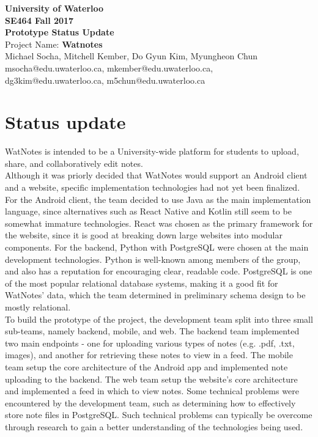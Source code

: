 \documentclass[12pt]{article}
\begin{document}
  \begin{center}
  \vspace*{\fill}
  {\Large\bf University of Waterloo}\\
  \vspace{3mm}
  {\large\bf SE464 Fall 2017}\\
  \vspace{3mm}
  {\Large\bf Prototype Status Update}\\
  \vspace{3mm}
  {\Large Project Name: {\bf Watnotes}}\\
  \vspace{5mm}
  Michael Socha, Mitchell Kember, Do Gyun Kim, Myungheon Chun\\
  \vspace{3mm}
  msocha@edu.uwaterloo.ca, mkember@edu.uwaterloo.ca, dg3kim@edu.uwaterloo.ca, m5chun@edu.uwaterloo.ca\\
  \vspace*{\fill}
  \end{center}

  \newpage

\section{Status update}
  WatNotes is intended to be a University-wide platform for students to upload, share, and collaboratively edit notes. \\

  Although it was priorly decided that WatNotes would support an Android client and a website, specific implementation technologies had not yet been finalized. For the Android client, the team decided to use Java as the main implementation language, since alternatives such as React Native and Kotlin still seem to be somewhat immature technologies. React was chosen as the primary framework for the website, since it is good at breaking down large websites into modular components. For the backend, Python with PostgreSQL were chosen at the main development technologies. Python is well-known among members of the group, and also has a reputation for encouraging clear, readable code. PostgreSQL is one of the most popular relational database systems, making it a good fit for WatNotes' data, which the team determined in preliminary schema design to be mostly relational. \\

  To build the prototype of the project, the development team split into three small sub-teams, namely backend, mobile, and web. The backend team implemented two main endpoints - one for uploading various types of notes (e.g. .pdf, .txt, images), and another for retrieving these notes to view in a feed. The mobile team setup the core architecture of the Android app and implemented note uploading to the backend. The web team setup the website's core architecture and implemented a feed in which to view notes. Some technical problems were encountered by the development team, such as determining how to effectively store note files in PostgreSQL. Such technical problems can typically be overcome through research to gain a better understanding of the technologies being used. \\
\end{document}
